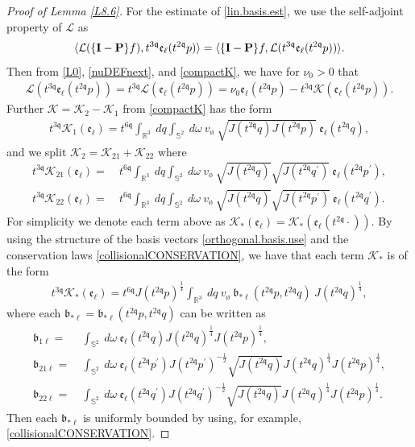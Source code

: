 \documentclass[reqno]{amsart}
\newcommand{\pv}{p}
\newcommand{\qv}{q}
\newcommand{\qq}{\mathfrak{q}}
\newcommand{\tqq}{t^{2\qq}}
\newcommand{\tTq}{t^{3\qq}}
\newcommand{\tQQq}{t^{6\qq}}
\newcommand{\compK}{\mathcal{K}}
\newcommand{\linL}{\mathcal{L}}
\newcommand{\micro}{{\bf \{I- P\}}}
\newcommand{\Emptyset}{\text{\o}}
\newcommand{\wb}{\mathfrak{b}}
\theoremstyle{definition}
\numberwithin{equation}{section}
\numberwithin{theorem}{section}
\begin{document}
\begin{proof}[Proof of Lemma \ref{L8.6}]
For the estimate of \eqref{lin.basis.est}, we use the self-adjoint property of $\linL$ as 
\begin{align*}
    \langle \linL( \micro  f), \tTq \mathfrak{e}_{\ell}(\tqq \pv)\rangle
    =
    \langle  \micro  f, \linL(\tTq \mathfrak{e}_{\ell}(\tqq \pv))\rangle.
\end{align*}
Then from \eqref{L0}, \eqref{nuDEFnext}, and \eqref{compactK}, we have for $\nu_0>0$ that
\begin{align*}
         \linL(\tTq \mathfrak{e}_{\ell}(\tqq \pv))
= \tTq \linL( \mathfrak{e}_{\ell}(\tqq \pv))
 =
 \nu_0 \mathfrak{e}_{\ell}(\tqq \pv)- \tTq\compK (\mathfrak{e}_{\ell}(\tqq \pv)).
\end{align*}
Further  $\compK = \compK_2 - \compK_1$ from \eqref{compactK} has the form 
\begin{align*}
 \tTq\compK_1 (\mathfrak{e}_{\ell}) 
 =
 \tQQq \int_{\mathbb{R}^3} ~  dq 
\int_{\mathbb{S}^{2}} ~ d\omega
~ v_{\Emptyset}   
~ \sqrt{J(\tqq\qv) J(\tqq\pv)} ~ \mathfrak{e}_{\ell}(\tqq \qv),
\end{align*}
and we split $\compK_2 = \compK_{21}+\compK_{22}$ where 
\begin{align*}
 \tTq\compK_{21} (\mathfrak{e}_{\ell}) 
 = &~
 \tQQq 
\int_{\mathbb{R}^3} ~  dq 
\int_{\mathbb{S}^{2}} ~ d\omega
~ v_{\Emptyset} ~  
\sqrt{J(\tqq \qv)} \sqrt{J(\tqq q^{\prime})} ~ \mathfrak{e}_{\ell}(\tqq \pv^{\prime}),
\\
 \tTq\compK_{22} (\mathfrak{e}_{\ell}) 
 = &~
 \tQQq 
\int_{\mathbb{R}^3} ~  dq 
\int_{\mathbb{S}^{2}} ~ d\omega
~ v_{\Emptyset} ~  
\sqrt{J(\tqq \qv)}\sqrt{J(\tqq p^{\prime})} ~ \mathfrak{e}_{\ell}(\tqq \qv^{\prime}).
\end{align*}
For simplicity we denote each term above as $\compK_* (\mathfrak{e}_{\ell}) =\compK_* (\mathfrak{e}_{\ell}(\tqq \cdot))$.  
By using the structure of the basis vectors \eqref{orthogonal.basis.use} and the conservation laws \eqref{collisionalCONSERVATION},  we have that each term $\compK_*$  is of the form 
\begin{align*}
 \tTq\compK_* (\mathfrak{e}_{\ell})
 =
 \tQQq J(\tqq\pv)^{\frac14}\int_{\mathbb{R}^3} ~  dq 
~ v_{\Emptyset}   ~ {\wb}_{*\ell}(\tqq \pv,\tqq \qv)
~ J(\tqq\qv)^{\frac14} ,
\end{align*}
where each ${\wb}_{*\ell}={\wb}_{*\ell}(\tqq \pv,\tqq \qv)$  can be written as 
\begin{align*}
{\wb}_{1\ell}
= &~
\int_{\mathbb{S}^{2}} ~ d\omega~ \mathfrak{e}_{\ell}(\tqq \qv) J(\tqq\qv)^{\frac14} J(\tqq\pv)^{\frac14},
\\
{\wb}_{21\ell}
= &~
\int_{\mathbb{S}^{2}} ~ d\omega~\mathfrak{e}_{\ell}(\tqq \pv^{\prime}) J(\tqq \pv^{\prime})^{-\frac12} \sqrt{J(\tqq \qv)}J(\tqq\qv)^{\frac14} J(\tqq\pv)^{\frac14},
\\
{\wb}_{22\ell}
= &~
\int_{\mathbb{S}^{2}} ~ d\omega~\mathfrak{e}_{\ell}(\tqq \qv^{\prime}) J(\tqq \qv^{\prime})^{-\frac12} \sqrt{J(\tqq \qv)}J(\tqq\qv)^{\frac14} J(\tqq\pv)^{\frac14}.
\end{align*}
Then each ${\wb}_{*\ell}$ is uniformly bounded by using, for example, \eqref{collisionalCONSERVATION}.  


\end{proof}
\end{document}
